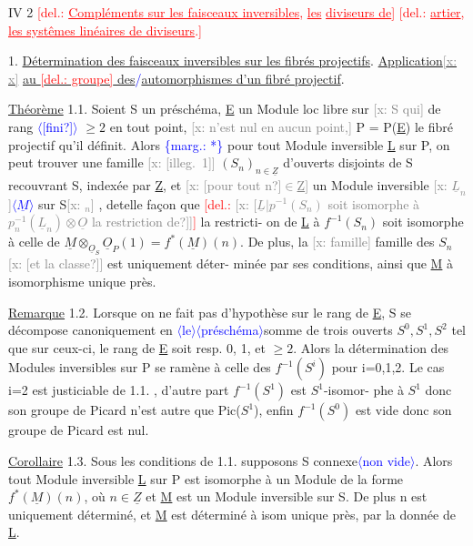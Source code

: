 \documentclass[11pt]{article}
\newcommand{\hand}[1]{\textcolor{blue}{#1}}
\let\over\relax
\newcommand{\over}[2]{\textcolor{gray}{#1}\textcolor{blue}{\ensuremath{^{\!\nearrow}}#2}}
\newcommand{\inserted}[2][]{\textcolor{blue}{$\langle$#2$\rangle$}}
\newcommand{\margin}[1]{\textcolor{blue}{\{\textsf{marg.:} #1\}}}
\newcommand{\deleted}[1]{\textcolor{red}{[\textsf{del.:} #1]}}
\newcommand{\xout}[1]{\textcolor{gray}{[\textsf{x:} #1]}}
\newcommand{\uline}[1]{\underline{#1}}
\newcommand{\unsure}[1]{[#1?]}
\newcommand{\illegible}[1]{[\textsf{illeg.\ #1}]}
\begin{document}
IV 2\over{0}{1} \deleted{\uline{Compléments sur les faisceaux inversibles}, \uline{les} \uline{diviseurs de}}
\deleted{\over{C}{\unsure{+}}\uline{artier}, \uline{les systêmes linéaires de diviseurs}.}

1. \uline{Détermination des faisceaux inversibles sur les fibrés projectifs}.
\uline{Application\xout{x}} \uline{au \deleted{groupe} des}\hand{/}\uline{automorphismes d'un fibré projectif}.

\uline{Théorème} 1.1. Soient S un préschéma, \underline{E} un Module loc libre sur \xout{S qui} de
rang \inserted{\unsure{fini}} $\geqslant 2$ en tout point,
\xout{n'est nul en aucun point,} P = P(\underline{E}) le fibré projectif qu'il définit. Alors
\margin{*} pour tout Module inversible \underline{L} sur P, on peut trouver une famille
\xout{\illegible{1}} $(S_n)_{n\in\underline{Z}}$ d'ouverts disjoints de S recouvrant S, indexée par \underline{Z}, et
\xout{\unsure{pour tout n}$\in$\underline{Z}} un Module inversible \xout{$\underline{L}_n$}\inserted[typed]{$\underline{M}$} sur S\xout{$_n$} , detelle façon que
\deleted{\xout{\unsure{$\underline{L}|p^{-1}(S_n)$ soit isomorphe à $p_n^{-1}(\underline{L}_n)\otimes\underline{O}$ la restriction de}}} la restricti-%
on de \underline{L} à $f^{-1}(S_n)$ soit isomorphe à celle de $\underline{M}\otimes_{\underline{O}_S}\underline{O}_P(1) = f^*(\underline{M})(n)$.
De plus, la \xout{famille} famille des $S_n$ \xout{\unsure{et la classe}} est uniquement déter-%
minée par ses conditions, ainsi que \underline{M} à isomorphisme unique près.

\uline{Remarque} 1.2. Lorsque on ne fait pas d'hypothèse sur le rang de \underline{E}, S se
décompose canoniquement en \inserted{le}\inserted[typed]{préschéma}somme de trois ouverts $S^0,S^1,S^2$ tel que sur
ceux-ci, le rang de \underline{E} soit resp. 0, 1, et $\geqslant 2$. Alors la détermination des
Modules inversibles sur P se ramène à celle des $f^{-1}(S^{i})$ pour i=0,1,2.
Le cas i=2 est justiciable de 1.1. , d'autre part $f^{-1}(S^1)$ est $S^1$-isomor-%
phe à $S^1$ donc son groupe de Picard n'est autre que Pic($S^1$), enfin
$f^{-1}(S^0)$ est vide donc son groupe de Picard est nul.

\uline{Corollaire} 1.3. Sous les conditions de 1.1. supposons S connexe\inserted[typed]{non vide}. Alors
tout Module inversible \underline{L} sur P est isomorphe à un Module de la forme
$f^*(\underline{M})(n)$, où $n\in\underline{Z}$ et \underline{M} est un Module inversible sur S. De plus n est
uniquement déterminé, et \underline{M} est déterminé à isom unique près, par la donnée
de \underline{L}.
\end{document}
